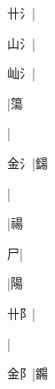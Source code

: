 \begin{multicols}{2}
{{卄{\cnxHanaA{}氵}}|{}\par
{\cjk{}{\cnsym{}　}山{\cnxHanaA{}氵}}|{}\par
{\cjk{}{\cnsym{}　}屾{\cnxHanaA{}氵}}|{}\par
{}|{\cjk{}簜}\par
{}|{}\par
{\cjk{}{\cnsym{}　}金{\cnxHanaA{}氵}}|{\cjk{}鐋}\par
{}|{}\par
{}|{\cjk{}禓}\par
{尸}|{}\par
{}|{\cjk{}陽}\par
{\cjk{}{\cnsym{}　}卄{阝}}|{}\par
{}|{}\par
{\cjk{}{\cnsym{}　}金{阝}}|{\cjk{}鐊}\par
}
\end{multicols}
